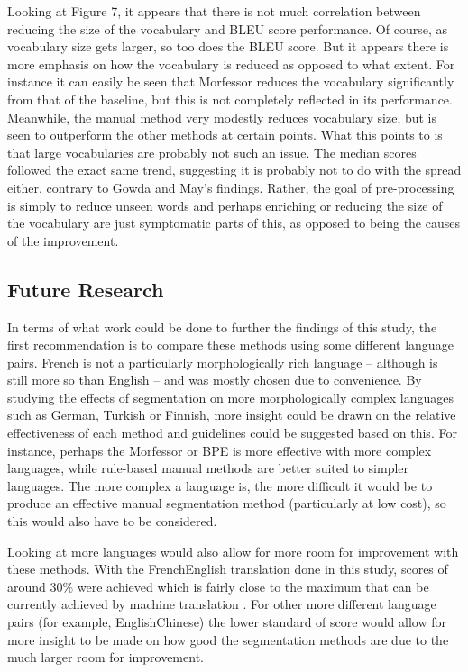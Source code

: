 \documentclass[11pt]{article}
\begin{document}
Looking at Figure 7, it appears that there is not much correlation between reducing the size of the vocabulary and BLEU score performance. Of course, as vocabulary size gets larger, so too does the BLEU score. But it appears there is more emphasis on how the vocabulary is reduced as opposed to what extent. For instance it can easily be seen that Morfessor reduces the vocabulary significantly from that of the baseline, but this is not completely reflected in its performance. Meanwhile, the manual method very modestly reduces vocabulary size, but is seen to outperform the other methods at certain points. What this points to is that large vocabularies are probably not such an issue. The median scores followed the exact same trend, suggesting it is probably not to do with the spread either, contrary to Gowda and May's \citeyearpar{gowda-may-2020-finding} findings. Rather, the goal of pre-processing is simply to reduce unseen words and perhaps enriching or reducing the size of the vocabulary are just symptomatic parts of this, as opposed to being the causes of the improvement.

\subsection{Future Research}

In terms of what work could be done to further the findings of this study, the first recommendation is to compare these methods using some different language pairs. French is not a particularly morphologically rich language -- although is still more so than English -- and was mostly chosen due to convenience. By studying the effects of segmentation on more morphologically complex languages such as German, Turkish or Finnish, more insight could be drawn on the relative effectiveness of each method and guidelines could be suggested based on this. For instance, perhaps the Morfessor or BPE is more effective with more complex languages, while rule-based manual methods are better suited to simpler languages. The more complex a language is, the more difficult it would be to produce an effective manual segmentation method (particularly at low cost), so this would also have to be considered.

\bigskip

Looking at more languages would also allow for more room for improvement with these methods. With the French\textendash English translation done in this study, scores of around 30\% were achieved which is fairly close to the maximum that can be currently achieved by machine translation \citep{jean2015using}. For other more different language pairs (for example, English\textendash Chinese) the lower standard of score would allow for more insight to be made on how good the segmentation methods are due to the much larger room for improvement.
\end{document}
